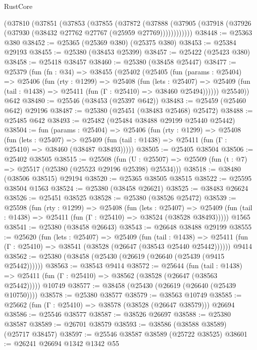 \begin{lexlean}{RustCore}
\begin{coremodule}
    (@37810
      (@37851
        (@37853
          (@37855
            (@37872
              (@37888
                (@37905 (@37918 (@37926 (@37930 (@38432 @27762 @27767 (@25959 @27769))))))))))))
@38448 := @25363 @380
@38452 := @25365 (@25369 @380) (@25375 @380)
@38453 := @25384 @29193
@38455 := @25380 (@38453 @25399)
@38457 := @25422 (@25423 @380)
@38458 := @25418 @38457
@38460 := @25380 (@38458 @25447)
@38477 := @25379
    (fun (fn : @34) =>
    @38455
      (@25402
        (@25405
          (fun (params : @25404) =>
          @25406
            (fun (rty : @1299) =>
            @25408
              (fun (lets : @25407) =>
              @25409 (fun (tail : @1438) => @25411 (fun (Γ : @25410) => @38460 @25494))))))
        @25540))
    @642
@38480 := @25546 (@38453 (@25397 @642))
@38483 := @25459 (@25460 @642) @29196
@38487 := @25380 (@25451 (@38483 @25468) @25472)
@38488 := @25485 @642
@38493 := @25482 (@25484 @38488 @29199 @25440 @25442)
@38504 := fun (params : @25404) =>
  @25406
    (fun (rty : @1299) =>
    @25408
      (fun (lets : @25407) =>
      @25409 (fun (tail : @1438) => @25411 (fun (Γ : @25410) => @38460 (@38487 @38493)))))
@38505 := @25405 @38504
@38506 := @25402 @38505
@38515 := @25508
    (fun (U : @25507) => @25509 (fun (t : @7) => @25517 (@25380 (@25523 @29196 @25398) @25534)))
@38518 := @38480 (@38506 @38515) @29194
@38520 := @25365 @38505 @38515
@38522 := @25595 @38504 @1563
@38524 := @25380 (@38458 @26621)
@38525 := @38483 @26624
@38526 := @25451 @38525
@38528 := @25380 (@38526 @25472)
@38539 := @25598
    (fun (rty : @1299) =>
    @25408
      (fun (lets : @25407) =>
      @25409 (fun (tail : @1438) => @25411 (fun (Γ : @25410) => @38524 (@38528 @38493)))))
    @1565
@38541 := @25380 (@38458 @26643)
@38543 := @26648 @38488 @29199
@38555 := @25620
    (fun (lets : @25407) =>
    @25409
      (fun (tail : @1438) =>
      @25411 (fun (Γ : @25410) => @38541 (@38528 (@26647 (@38543 @25440 @25442))))))
    @9414
@38562 := @25380 (@38458 (@25430 (@26619 (@26640 (@25439 (@9415 @25442))))))
@38563 := @38543 @9414
@38572 := @25644
    (fun (tail : @1438) => @25411 (fun (Γ : @25410) => @38562 (@38528 (@26647 (@38563 @25442)))))
    @10749
@38577 := @38458 (@25430 (@26619 (@26640 (@25439 @10750))))
@38578 := @25380 @38577
@38579 := @38563 @10749
@38585 := @25662 (fun (Γ : @25410) => @38578 (@38528 (@26647 @38579))) @26694
@38586 := @25546 @38577
@38587 := @38526 @26697
@38588 := @25380 @38587
@38589 := @26701 @38579
@38593 := @38586 (@38588 @38589) (@25717 @38457)
@38597 := @25546 @38587 @38589 (@25722 @38525)
@38601 := @26241 @26694 @1342 @1342 @55

\end{coremodule}
\end{lexlean}

